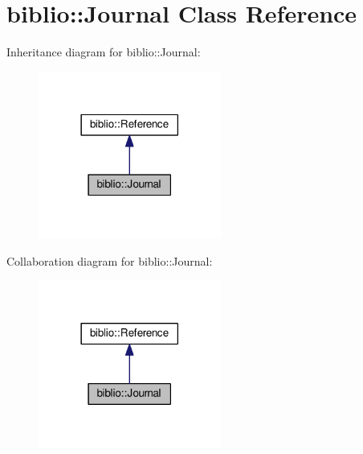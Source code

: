 \hypertarget{classbiblio_1_1Journal}{}\section{biblio\+:\+:Journal Class Reference}
\label{classbiblio_1_1Journal}


Inheritance diagram for biblio\+:\+:Journal\+:\nopagebreak
\begin{figure}[H]
\begin{center}
\leavevmode
\includegraphics[width=170pt]{classbiblio_1_1Journal__inherit__graph}
\end{center}
\end{figure}


Collaboration diagram for biblio\+:\+:Journal\+:\nopagebreak
\begin{figure}[H]
\begin{center}
\leavevmode
\includegraphics[width=170pt]{classbiblio_1_1Journal__coll__graph}
\end{center}
\end{figure}

